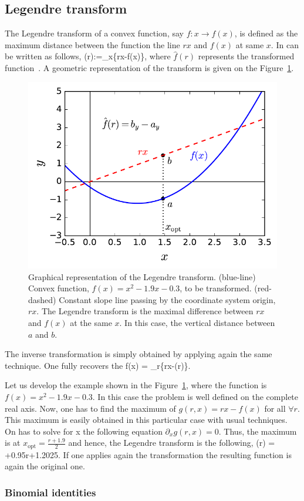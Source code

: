 \subsection{Legendre transform}
\label{app:legendre-transform}

The Legendre transform of a convex function, say $f:x \rightarrow f(x)$, is defined as the maximum distance between the function the line $rx$ and $f(x)$ at same $x$.
In can be written as follows,
\be
  (r):=\max_{x}\{rx-f(x)\},
\ee
where $\hat{f}(r)$ represents the transformed function~\citep{Rockafellar1996}.
A geometric representation of the transform is given on the Figure~\ref{fig:lt-geometric-legendre}.

\begin{figure}[htp]
  \centering
  \includegraphics[scale=.65]{img/plots/LT_legendre.pdf}
  \caption[Graphical representation of the Legendre trasnform.]{Graphical representation of the Legendre transform. (blue-line) Convex function, $f(x)=x^2-1.9x-0.3$, to be transformed. (red-dashed) Constant slope line passing by the coordinate system origin, $rx$. The Legendre transform is the maximal difference between $rx$ and $f(x)$ at the same $x$. In this case, the vertical distance between $a$ and $b$.}
  \label{fig:lt-geometric-legendre}
\end{figure}

The inverse transformation is simply obtained by applying again the same technique.
One fully recovers the
\be
  f(x) = \max_{r}\{rx-(r)\}.
\ee

Let us develop the example shown in the Figure~\ref{fig:lt-geometric-legendre}, where the function is $f(x)=x^2-1.9x-0.3$.
In this case the problem is well defined on the complete real axis.
Now, one has to find the maximum of $g(r,x)=rx-f(x)$ for all $\forall r$.
This maximum is easily obtained in this particular case with usual techniques.
On has to solve for x the following equation $\partial_x g(r,x) = 0$. Thus, the maximum is at $x_{\text{opt}} = \frac{r+1.9}{2}$ and hence, the Legendre transform is the following,
\be
  (r) = +0.95r+1.2025.
\ee
If one applies again the transformation the resulting function is again the original one.

\subsubsection{Binomial identities}
